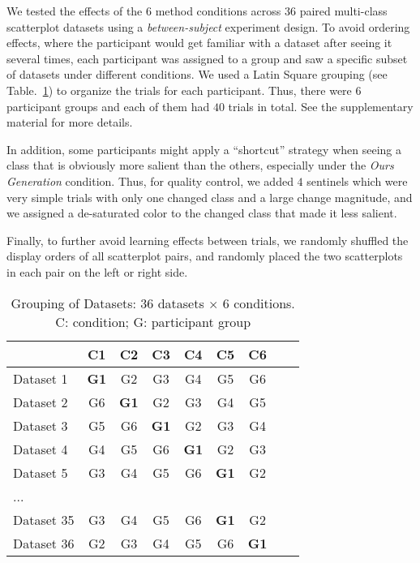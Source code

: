 \vspace{.3em}
 We tested the effects of the $6$ method conditions across $36$ paired multi-class scatterplot datasets using a \emph{between-subject} experiment design. To avoid ordering effects, where the participant would get familiar with a dataset after seeing it several times, each participant was assigned to a group and saw a specific subset of datasets under different conditions. We used a Latin Square grouping (see Table.~\ref{tab:latinsquare}) to organize the trials for each participant. Thus, there were $6$ participant groups and each of them had $40$ trials in total. See the supplementary material for more details.

In addition, some participants might apply a ``shortcut'' strategy when seeing a class that is obviously more salient than the others, especially under the \emph{Ours Generation} condition. Thus, for quality control, we added $4$ sentinels which were very simple trials with only one changed class and a large change magnitude, and we assigned a de-saturated color to the changed class that made it less salient.

Finally, to further avoid learning effects between trials, we randomly shuffled the display orders of all scatterplot pairs, and randomly placed the two scatterplots in each pair on the left or right side.

\begin{table}[ht]
\renewcommand\arraystretch{1}
\centering
\caption{Grouping of Datasets: $36$ datasets $\times$ $6$ conditions. C: condition; G: participant group}
\label{tab:latinsquare}
\begin{tabular}{lcccccccc}
\hline
 & C1 & C2 & C3  & C4 & C5 & C6 \\

\hline
Dataset 1 & \textbf{G1} & G2 & G3  & G4 & G5 & G6 \\
Dataset 2 & G6 & \textbf{G1} & G2 & G3  & G4 & G5 \\
Dataset 3 & G5  & G6 & \textbf{G1} & G2 & G3 & G4 \\
Dataset 4 & G4 & G5  & G6 & \textbf{G1} & G2 & G3 \\
Dataset 5 & G3 & G4 & G5  & G6 & \textbf{G1} & G2 \\
... & & & & & & &\\
Dataset 35 & G3 & G4 & G5  & G6 & \textbf{G1} & G2 \\
Dataset 36 & G2 & G3  & G4 & G5 & G6 & \textbf{G1}  \\

\hline
\end{tabular}
\end{table}


